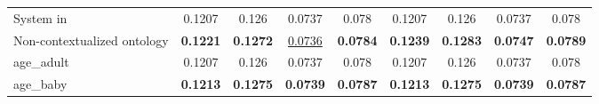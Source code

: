 	\begin{center}
	
	\tablelasttail{\hline}
	\begin{supertabular}{lcccc||cccc}
	\label{eval::1}
	\small{System in \cite{Ksibi2012}} & {\scriptsize{0.1207}} & {\scriptsize{0.126}} & {\scriptsize{0.0737}} & {\scriptsize{0.078}}& {\scriptsize{0.1207}} & {\scriptsize{0.126}} & {\scriptsize{0.0737}} & {\scriptsize{0.078}}\\
\small{Non-contextualized ontology} & \textbf{\scriptsize{0.1221}} & \textbf{\scriptsize{0.1272}} & \underline{\scriptsize{0.0736}} & \textbf{\scriptsize{0.0784}}& \textbf{\scriptsize{0.1239}} & \textbf{\scriptsize{0.1283}} & \textbf{\scriptsize{0.0747}} & \textbf{\scriptsize{0.0789}}\\
\small{age\_adult} & {\scriptsize{0.1207}} & {\scriptsize{0.126}} & {\scriptsize{0.0737}} & {\scriptsize{0.078}}& {\scriptsize{0.1207}} & {\scriptsize{0.126}} & {\scriptsize{0.0737}} & {\scriptsize{0.078}}\\
\small{age\_baby} & \textbf{\scriptsize{0.1213}} & \textbf{\scriptsize{0.1275}} & \textbf{\scriptsize{0.0739}} & \textbf{\scriptsize{0.0787}}& \textbf{\scriptsize{0.1213}} & \textbf{\scriptsize{0.1275}} & \textbf{\scriptsize{0.0739}} & \textbf{\scriptsize{0.0787}}\\

\end{supertabular}
\end{center}
